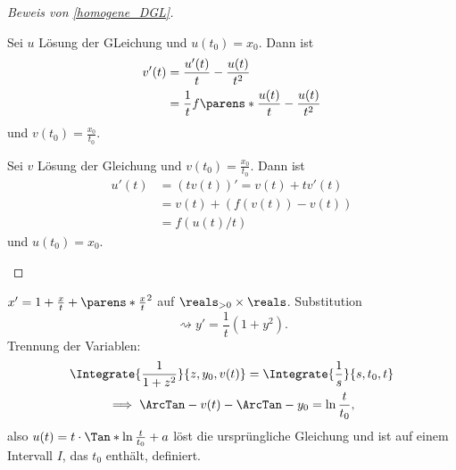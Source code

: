\begin{proof}[Beweis von \ref{homogene_DGL}]
  \begin{proofdescription}
    \item[\hin] Sei \( u \) Lösung der  GLeichung und \( u(t_0)=x_0 \). Dann ist 
    \begin{align*}
      v'(t)&=\frac{u'(t)}{t}-\frac{u(t)}{t^2}\\
      &=\frac{1}{t}f\parens*{\frac{u(t)}{t}}-\frac{u(t)}{t^2}
    \end{align*}
    und \( v(t_0)=\frac{x_0}{t_0} \).
    \item[\rueck] Sei \( v \) Lösung der  Gleichung und \( v(t_0)=\frac{x_0}{t_0} \). Dann ist
    \begin{align*}
      u'(t)&=(t v(t))'=v(t)+t v'(t)\\
      &=v(t)+(f(v(t))-v(t))\\
      &=f(u(t)/t)
    \end{align*}
    und \( u(t_0)=x_0 \).
  \end{proofdescription}
  
\end{proof}
\begin{beispiel*}
  \( x'=1+\frac{x}{t}+\parens*{\frac{x}{t}}^2 \) auf \( \reals_{>0}\times \reals \). Substitution
  \begin{equation*}
    \rightsquigarrow y'=\frac{1}{t}(1+y^2).
  \end{equation*}
  Trennung der Variablen:
  \begin{gather*}
    \Integrate{\frac{1}{1+z^2}}{z,y_0,v(t)}=\Integrate{\frac{1}{s}}{s,t_0,t}\\
    \implies\ArcTan-{v(t)}-\ArcTan-{y_0}=\ln \frac{t}{t_0},
  \end{gather*}
  also \( u(t)=t\cdot \Tan*{\ln \frac{t}{t_0}+a} \) löst die ursprüngliche Gleichung und ist auf einem Intervall \( I \), das \( t_0 \) enthält, definiert.
\end{beispiel*}
